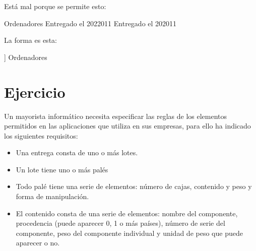 \documentclass[letterpaper,10pt,spanish]{sphinxmanual}
\begin{document}
Está mal porque se permite esto:

\begin{sphinxVerbatim}[commandchars=\\\{\}]
        Ordenadores
        Entregado el 20\PYGZhy{}2\PYGZhy{}2011
        Entregado el 20\PYGZhy{}2011
\end{sphinxVerbatim}

La forma  es esta:

\begin{sphinxVerbatim}[commandchars=\\\{\}]
\PYG{c+cp}{\PYGZlt{}!DOCTYPE pedido[}
]\PYGZgt{}
        Ordenadores
\end{sphinxVerbatim}


\section{Ejercicio}
\label{\detokenize{tema5:id1}}
Un mayorista informático necesita especificar las reglas de los elementos permitidos en las aplicaciones que utiliza en sus empresas, para ello ha indicado los siguientes requisitos:
\begin{itemize}
\item {} 
Una entrega consta de uno o más lotes.

\item {} 
Un lote tiene uno o más palés

\item {} 
Todo palé tiene una serie de elementos: número de cajas, contenido y peso y forma de manipulación.

\item {} 
El contenido consta de una serie de elementos: nombre del componente, procedencia (puede aparecer 0, 1 o más países), número de serie del componente, peso del componente individual y unidad de peso que puede aparecer o no.

\end{itemize}
\end{document}
